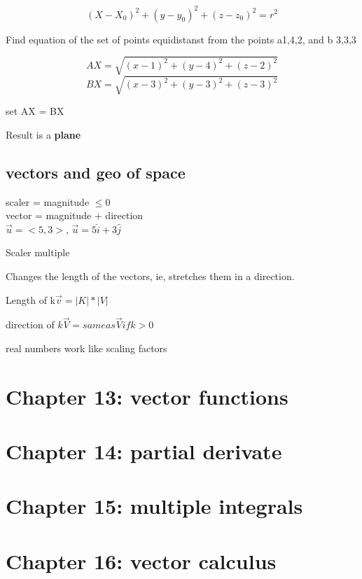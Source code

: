 \documentclass{article}
\begin{document}
\[ (X-X_0)^2 + (y-y_0)^2 + (z-z_0)^2 = r^2 \] 

Find equation of the set of points equidistanst from the points a1,4,2, and b 3,3,3

\[AX = \sqrt{(x-1)^2 + (y-4)^2 + (z-2) ^2} \] 
\[ BX = \sqrt{(x-3)^2 + (y-3)^2 + (z-3) ^2} \]

set AX = BX

Result is a \textbf{plane}

\subsection{vectors and geo of space}
scaler = magnitude $\leq 0$ \\
vector = magnitude + direction \\

$\vec{u} = <5,3>$, $\vec{u} =5 \hat{i} +3\hat{j}$ \\


Scaler multiple 

Changes the length of the vectors, ie, stretches them in a direction. 

Length of k$\vec{v} =|K| * |V|$ 

direction of $k\vec{V} = same as \vec{V} if k > 0$

real numbers work like scaling factors 


\section{Chapter 13: vector functions}

\section{Chapter 14: partial derivate}

\section{Chapter 15: multiple integrals}

\section{Chapter 16: vector calculus}
\end{document}
